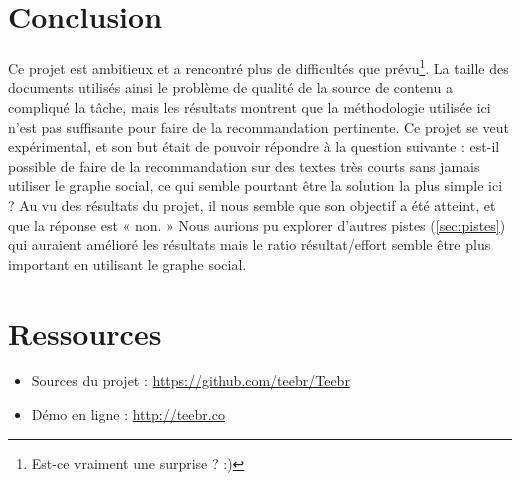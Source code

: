 
\section{Conclusion}

Ce projet est ambitieux et a rencontré plus de difficultés que
prévu\footnote{Est-ce vraiment une surprise ? :)}. La taille des documents
utilisés ainsi le problème de qualité de la source de contenu a compliqué la
tâche, mais les résultats montrent que la méthodologie utilisée ici n’est pas
suffisante pour faire de la recommandation pertinente. Ce projet se veut
expérimental, et son but était de pouvoir répondre à la question suivante :
est-il possible de faire de la recommandation sur des textes très courts sans
jamais utiliser le graphe social, ce qui semble pourtant être la solution la
plus simple ici ? Au vu des résultats du projet, il nous semble que son
objectif a été atteint, et que la réponse est « non. » Nous aurions pu explorer
d’autres pistes (\ref{sec:pistes}) qui auraient amélioré les résultats mais le
ratio résultat/effort semble être plus important en utilisant le graphe social.

\section{Ressources}

\begin{itemize}
  \item Sources du projet : \url{https://github.com/teebr/Teebr}
  \item Démo en ligne : \url{http://teebr.co}
\end{itemize}
